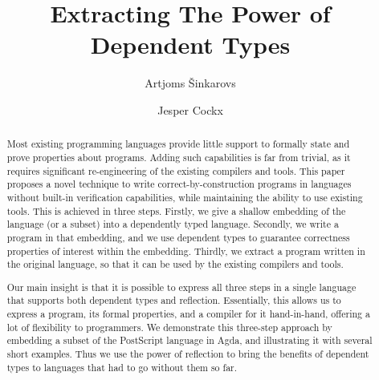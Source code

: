 \documentclass[sigplan,screen]{acmart}
\begin{document}
\title[]{Extracting The Power of Dependent Types}


\author[A. {\v{S}}inkarovs]{Artjoms {\v{S}}inkarovs}


\author[J. Cockx]{Jesper Cockx}


\begin{abstract}

  Most existing programming languages provide little support to formally
  state and prove properties about programs.  Ad\-ding such capabilities is far
  from trivial, as it requires significant re-engineering of the existing
  compilers and tools.  This paper proposes a novel technique to write
  correct-by-con\-struc\-tion programs in languages without built-in verification
  capabilities, while maintaining the ability to use existing tools.
  This is achieved in three steps.  Firstly, we
  give a shallow embedding of the language (or a subset) into a
  dependently typed language.  Secondly, we write a program
  in that embedding, and we use dependent types to guarantee
  correctness properties of interest within the embedding.  Thirdly, we
  extract a program written in the original language,
  so that it can be used by the existing compilers and tools.

  Our main insight is that it is possible to
  express all three steps in a single language that supports
  both dependent typ\-es and reflection. Essentially,
  this allows us to express a program, its formal properties, and
  a compiler for it hand-in-hand, offering a lot of flexibility to programmers.
  We demonstrate this three-step approach by embedding a subset of
  the PostScript language in Agda, and illustrating it with several short examples.
  Thus we use the power of reflection to bring the benefits of dependent types to languages
  that had to go without them so far.
\end{abstract}
\maketitle
\end{document}

